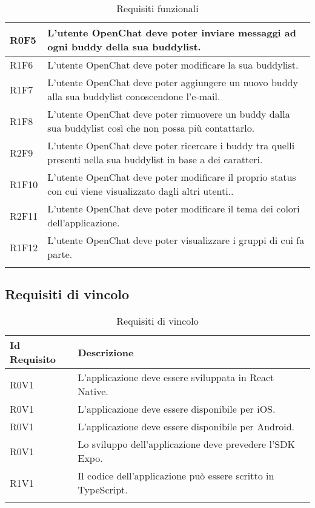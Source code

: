 \begin{longtable}{|C{3cm}| C{10cm}|}
	R0F5 & L'utente OpenChat deve poter inviare messaggi ad ogni buddy della sua buddylist.\\ \hline 
	R1F6 & L'utente OpenChat deve poter modificare la sua buddylist.\\ \hline 
	R1F7 & L'utente OpenChat deve poter aggiungere un nuovo buddy alla sua buddylist conoscendone l'e-mail.\\ \hline 
	R1F8 & L'utente OpenChat deve poter rimuovere un buddy dalla sua buddylist così che non possa più contattarlo.\\ \hline 
	R2F9 & L'utente OpenChat deve poter ricercare i buddy tra quelli presenti nella sua buddylist in base a dei caratteri.\\ \hline 
	R1F10 & L'utente OpenChat deve poter modificare il proprio status con cui viene visualizzato dagli altri utenti..\\ \hline 
	R2F11 & L'utente OpenChat deve poter modificare il tema dei colori dell'applicazione.\\ \hline 
	R1F12 & L'utente OpenChat deve poter visualizzare i gruppi di cui fa parte.\\ \hline 
	
	\caption{Requisiti funzionali}
	\label{tabella:req}
\end{longtable}

\subsection{Requisiti di vincolo}
\begin{longtable}{|C{3cm}|C{10cm}|}
	\hline
	\textbf{Id Requisito} & \textbf{Descrizione}\\
	\hline
	\endhead
	R0V1 & L'applicazione deve essere sviluppata in React Native. \\ \hline 
	R0V1 & L'applicazione deve essere disponibile per iOS.  \\ \hline 
	R0V1 & L'applicazione deve essere disponibile per Android.  \\ \hline 
	R0V1 & Lo sviluppo dell'applicazione deve prevedere l'SDK Expo. \\ \hline 
	R1V1 & Il codice dell'applicazione può essere scritto in TypeScript.  \\ \hline 
	\caption{Requisiti di vincolo}
	\label{tabella:reqV}
\end{longtable}

